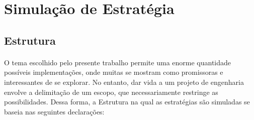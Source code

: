 \FloatBarrier
\section{Simulação de Estratégia}

\FloatBarrier
\subsection{Estrutura}
\label{sub:estrutura}

\paragraph{} O tema escolhido pelo presente trabalho permite uma enorme quantidade possíveis implementações, onde muitas se mostram como promissoras e interessantes de se explorar. No entanto, dar vida a um projeto de engenharia envolve a delimitação de um escopo, que necessariamente restringe as possibilidades. Dessa forma, a Estrutura na qual as estratégias são simuladas se baseia nas seguintes declarações:


